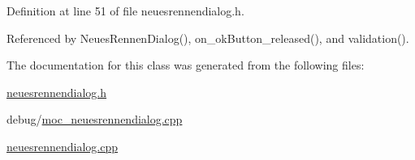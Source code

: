 Definition at line 51 of file neuesrennendialog.h.

Referenced by NeuesRennenDialog(), on\_\-okButton\_\-released(), and validation().

The documentation for this class was generated from the following files:\begin{CompactItemize}
\item 
\hyperlink{neuesrennendialog_8h}{neuesrennendialog.h}\item 
debug/\hyperlink{moc__neuesrennendialog_8cpp}{moc\_\-neuesrennendialog.cpp}\item 
\hyperlink{neuesrennendialog_8cpp}{neuesrennendialog.cpp}\end{CompactItemize}

